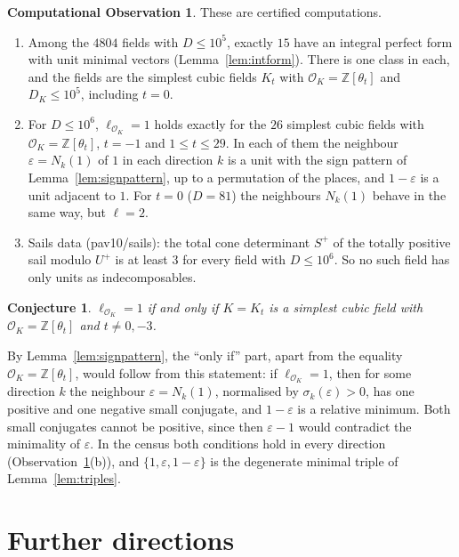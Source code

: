 \documentclass[11pt,reqno]{amsart}
\theoremstyle{plain}
\newtheorem{conjecture}[theorem]{Conjecture}
\theoremstyle{definition}
\newtheorem{observation}[theorem]{Computational Observation}
\newcommand{\Z}{\mathbb{Z}}
\begin{document}
\begin{observation}\label{obs:indec}
These are certified computations.
\begin{enumerate}[label=\textup{(\alph*)},leftmargin=2.2em]
\item Among the $4804$ fields with $D\le10^5$, exactly $15$ have an integral perfect form with unit minimal vectors
(Lemma~\ref{lem:intform}). There is one class in each, and the fields are the simplest cubic fields $K_t$ with
$\mathcal O_K=\Z[\theta_t]$ and $D_K\le10^5$, including $t=0$.
\item For $D\le10^6$, $\ell_{\mathcal O_K}=1$ holds exactly for the $26$ simplest cubic fields with
$\mathcal O_K=\Z[\theta_t]$, $t=-1$ and $1\le t\le29$. In each of them the neighbour $\varepsilon=N_k(1)$ of $1$ in each
direction $k$ is a unit with the sign pattern of Lemma~\ref{lem:signpattern}, up to a permutation of the places,
and $1-\varepsilon$ is a unit adjacent to $1$. For $t=0$ ($D=81$) the neighbours $N_k(1)$ behave in the same way, but $\ell=2$.
\item Sails data (pav10/sails): the total cone determinant $S^+$ of the totally positive sail modulo $U^+$ is at
least $3$ for every field with $D\le10^6$. So no such field has only units as indecomposables.
\end{enumerate}
\end{observation}

\begin{conjecture}\label{conj:ellone}
$\ell_{\mathcal O_K}=1$ if and only if $K=K_t$ is a simplest cubic field with $\mathcal O_K=\Z[\theta_t]$ and $t\ne0,-3$.
\end{conjecture}

By Lemma~\ref{lem:signpattern}, the ``only if'' part, apart from the equality $\mathcal O_K=\Z[\theta_t]$, would
follow from this statement: if $\ell_{\mathcal O_K}=1$, then for some direction $k$ the neighbour
$\varepsilon=N_k(1)$, normalised by $\sigma_k(\varepsilon)>0$, has one positive and one negative small conjugate, and
$1-\varepsilon$ is a relative minimum. Both small conjugates cannot be positive, since then $\varepsilon-1$ would
contradict the minimality of $\varepsilon$. In the census both conditions hold in every direction
(Observation~\ref{obs:indec}(b)), and $\{1,\varepsilon,1-\varepsilon\}$ is the degenerate minimal triple of
Lemma~\ref{lem:triples}.

\section{Further directions}\label{sec:forward}
\end{document}

